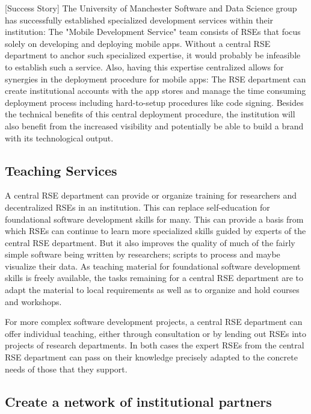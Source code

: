 \documentclass[a4paper]{article}
\begin{document}
[Success Story]
The University of Manchester Software and Data Science group has successfully established specialized development services within their institution:
The "Mobile Development Service" \autocite{manchester_mobile} team consists of RSEs that focus solely on developing and deploying mobile apps.
Without a central RSE department to anchor such specialized expertise, it would probably be infeasible to establish such a service.
Also, having this expertise centralized allows for synergies in the deployment procedure for mobile apps:
The RSE department can create institutional accounts with the app stores and manage the time consuming deployment process including hard-to-setup procedures like code signing.
Besides the technical benefits of this central deployment procedure, the institution will also benefit from the increased visibility and potentially be able to build a brand with its technological output.

\subsection{Teaching Services}
\label{sec:teaching}

A central RSE department can provide or organize training for researchers and decentralized RSEs in an institution.
This can replace self-education for foundational software development skills for many.
This can provide a basis from which RSEs can continue to learn more specialized skills guided by experts of the central RSE department.
But it also improves the quality of much of the fairly simple software being written by researchers; scripts to process and maybe visualize their data.
As teaching material for foundational software development skills is freely available,
the tasks remaining for a central RSE department are to adapt the material to local requirements as well as to organize and hold courses and workshops.

For more complex software development projects, a central RSE department can offer individual teaching, either through consultation or by lending out RSEs into projects of research departments.
In both cases the expert RSEs from the central RSE department can pass on their knowledge precisely adapted to the concrete needs of those that they support.

\subsection{Create a network of institutional partners}
\label{sec:partners}
\end{document}
